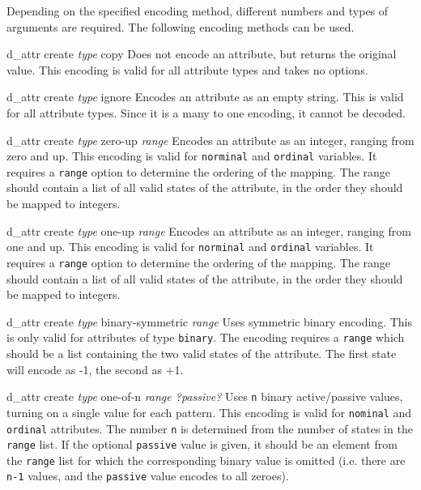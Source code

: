 \documentclass{article}
\begin{document}
\begin{options}
Depending on the specified encoding method, different numbers and types
of arguments are required.  The following encoding methods can be used.
\begin{options}
\item[d\_attr create \textsl{type} copy]
    Does not encode an attribute, but returns the original value.  This
    encoding is valid for all attribute types and takes no options.
\item[d\_attr create \textsl{type} ignore]
    Encodes an attribute as an empty string. This is valid for all
    attribute types.  Since it is a many to one encoding, it cannot be
    decoded.
\item[d\_attr create \textsl{type} zero-up \textsl{range}]
    Encodes an attribute as an integer, ranging from zero and up. This
    encoding is valid for \texttt{norminal} and \texttt{ordinal}
    variables. It requires a \texttt{range} option to determine the
    ordering of the mapping.  The range should contain a list of all
    valid states of the attribute, in the order they should be mapped to
    integers.
\item[d\_attr create \textsl{type} one-up \textsl{range}]
    Encodes an attribute as an integer, ranging from one and up. This
    encoding is valid for \texttt{norminal} and \texttt{ordinal}
    variables. It requires a \texttt{range} option to determine the
    ordering of the mapping.  The range should contain a list of all
    valid states of the attribute, in the order they should be mapped to
    integers.
\item[d\_attr create \textsl{type} binary-symmetric \textsl{range}]
    Uses symmetric binary encoding.  This is only valid for attributes
    of type \texttt{binary}.  The encoding requires a \texttt{range}
    which should be a list containing the two valid states of the
    attribute.  The first state will encode as -1, the second as +1.
\item[d\_attr create \textsl{type} one-of-n \textsl{range ?passive?}]
    Uses \texttt{n} binary active/passive values, turning on a single
    value for each pattern.  This encoding is valid for \texttt{nominal}
    and \texttt{ordinal} attributes.  The number \texttt{n} is
    determined from the number of states in the \texttt{range} list.  If
    the optional \texttt{passive} value is given, it should be an
    element from the \texttt{range} list for which the corresponding
    binary value is omitted (i.e. there are \texttt{n-1} values, and the
    \texttt{passive} value encodes to all zeroes).

\end{options}
\end{options}
\end{document}
